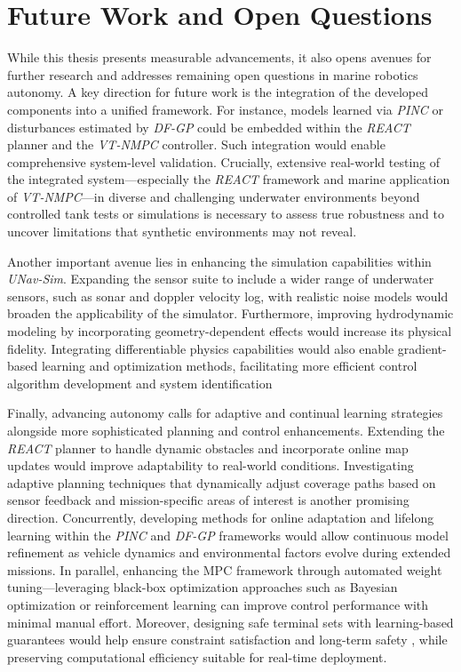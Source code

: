 \section{Future Work and Open Questions}
\label{sec:future_work}


While this thesis presents measurable advancements, it also opens avenues for further research and addresses remaining open questions in marine robotics autonomy. A key direction for future work is the integration of the developed components into a unified framework. For instance, models learned via \textit{PINC} or disturbances estimated by \textit{DF-GP} could be embedded within the \textit{REACT} planner and the \textit{VT-NMPC} controller. Such integration would enable comprehensive system-level validation. Crucially, extensive real-world testing of the integrated system—especially the \textit{REACT} framework and marine application of \textit{VT-NMPC}—in diverse and challenging underwater environments beyond controlled tank tests or simulations is necessary to assess true robustness and to uncover limitations that synthetic environments may not reveal.

Another important avenue lies in enhancing the simulation capabilities within \textit{UNav-Sim}. Expanding the sensor suite to include a wider range of underwater sensors, such as sonar and doppler velocity log, with realistic noise models would broaden the applicability of the simulator. Furthermore, improving hydrodynamic modeling by incorporating geometry-dependent effects would increase its physical fidelity. Integrating differentiable physics capabilities would also enable gradient-based learning and optimization methods, facilitating more efficient control algorithm development and system identification

Finally, advancing autonomy calls for adaptive and continual learning strategies alongside more sophisticated planning and control enhancements. Extending the \textit{REACT} planner to handle dynamic obstacles and incorporate online map updates would improve adaptability to real-world conditions. Investigating adaptive planning techniques that dynamically adjust coverage paths based on sensor feedback and mission-specific areas of interest is another promising direction. Concurrently, developing methods for online adaptation and lifelong learning within the \textit{PINC} and \textit{DF-GP} frameworks would allow continuous model refinement as vehicle dynamics and environmental factors evolve during extended missions. In parallel, enhancing the \ac{MPC} framework through automated weight tuning—leveraging black-box optimization approaches such as Bayesian optimization \cite{garnett2023bayesian} or reinforcement learning \cite{sutton1998reinforcement} can improve control performance with minimal manual effort. Moreover, designing safe terminal sets with learning-based guarantees would help ensure constraint satisfaction and long-term safety \cite{hewing2020learning}, while preserving computational efficiency suitable for real-time deployment.
